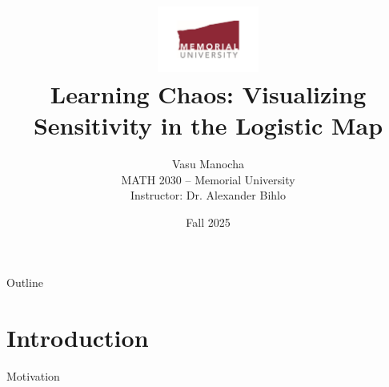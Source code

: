 \documentclass{beamer}
\title{
  \includegraphics[width=0.25\textwidth]{../logo/mun_logo.pdf}\\[1em]
  Learning Chaos: Visualizing Sensitivity in the Logistic Map
}
\author{Vasu Manocha \\
MATH 2030 – Memorial University \\
Instructor: Dr. Alexander Bihlo}
\date{Fall 2025}
\begin{document}
\begin{frame}
  \titlepage
\end{frame}

\begin{frame}{Outline}
  \tableofcontents
\end{frame}

\section{Introduction}
\begin{frame}{Motivation}
\end{frame}
\end{document}
